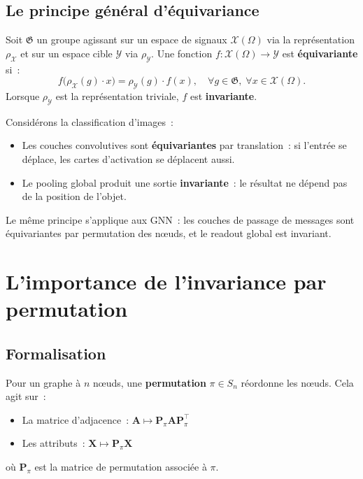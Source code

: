 \subsection{Le principe g\'en\'eral d'\'equivariance}

\begin{theoreme}
Soit $\mathfrak{G}$ un groupe agissant sur un espace de signaux
$\mathcal{X}(\Omega)$ via la repr\'esentation $\rho_{\mathcal{X}}$ et sur un
espace cible $\mathcal{Y}$ via $\rho_{\mathcal{Y}}$. Une fonction
$f: \mathcal{X}(\Omega) \to \mathcal{Y}$ est \textbf{\'equivariante} si~:
\[
    f\bigl(\rho_{\mathcal{X}}(g) \cdot x\bigr) = \rho_{\mathcal{Y}}(g) \cdot f(x),
    \quad \forall g \in \mathfrak{G},\; \forall x \in \mathcal{X}(\Omega).
\]
Lorsque $\rho_{\mathcal{Y}}$ est la repr\'esentation triviale, $f$ est
\textbf{invariante}.
\end{theoreme}

\begin{intuition}[title=\textbf{\'Equivariance en images}]
Consid\'erons la classification d'images~:
\begin{itemize}
    \item Les couches convolutives sont \textbf{\'equivariantes} par translation~:
          si l'entr\'ee se d\'eplace, les cartes d'activation se d\'eplacent aussi.
    \item Le pooling global produit une sortie \textbf{invariante}~: le r\'esultat
          ne d\'epend pas de la position de l'objet.
\end{itemize}
Le m\^eme principe s'applique aux GNN~: les couches de passage de messages sont
\'equivariantes par permutation des n\oe uds, et le readout global est invariant.
\end{intuition}

\section{L'importance de l'invariance par permutation}

\subsection{Formalisation}

Pour un graphe \`a $n$ n\oe uds, une \textbf{permutation} $\pi \in S_n$ r\'eordonne
les n\oe uds. Cela agit sur~:
\begin{itemize}
    \item La matrice d'adjacence~: $\mathbf{A} \mapsto \mathbf{P}_\pi \mathbf{A} \mathbf{P}_\pi^\top$
    \item Les attributs~: $\mathbf{X} \mapsto \mathbf{P}_\pi \mathbf{X}$
\end{itemize}
o\`u $\mathbf{P}_\pi$ est la matrice de permutation associ\'ee \`a $\pi$.

